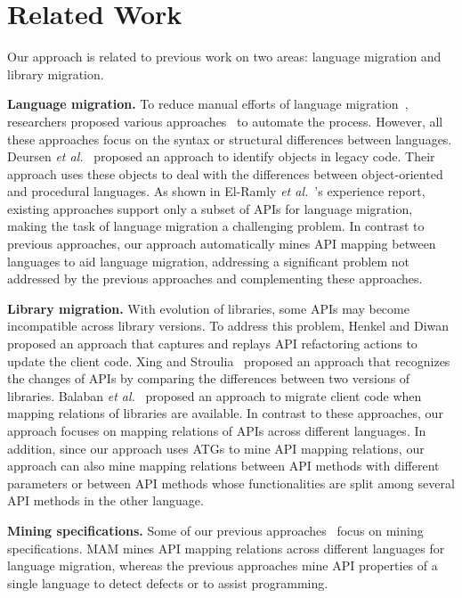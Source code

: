 \section{Related Work}
\label{sec:related}

Our approach is related to previous work on two areas:
language migration and library migration.

\textbf{Language migration.} To reduce manual efforts of language
migration~\cite{samet1981experience}, researchers proposed various
approaches~\cite{hassan2005lightweight,van1999identifying,waters1988program,mossienko2003automated,yasumatsu1995spice} to automate the process.
However, all these approaches focus on the syntax or structural differences between
languages. Deursen \emph{et al.}~\cite{van1999identifying} proposed an approach to identify
objects in legacy code. Their approach uses these objects to deal with the
differences between object-oriented and procedural languages. As
shown in El-Ramly \emph{et al.}~\cite{el2006experiment}'s experience
report, existing approaches support only a subset of APIs for language migration,
making the task of language migration a challenging problem.
In contrast to previous approaches, our approach automatically mines API mapping between
languages to aid language migration, addressing a significant
problem not addressed by the previous approaches and complementing
these approaches.

\textbf{Library migration.} With evolution of libraries, some APIs
may become incompatible across library versions. To address this
problem, Henkel and Diwan~\cite{henkel2005catchup} proposed an approach that captures
and replays API refactoring actions to update the client code.
Xing and Stroulia~\cite{xing2007api} proposed an approach that
recognizes the changes of APIs by comparing the differences between two
versions of libraries. Balaban \emph{et al.}~\cite{balaban2005refactoring} proposed
an approach to migrate client code when mapping relations of libraries are
available. In contrast to these approaches, our approach focuses on
mapping relations of APIs across different languages. In addition, since
our approach uses ATGs to mine API mapping relations, our approach can also
mine mapping relations between API methods with different parameters or between
API methods whose functionalities are split among several API methods in the other language.

\textbf{Mining specifications.} Some of our previous approaches~\cite{zhong09:inferring,zhong09:mapo,thummalapenta09:mining,thummalapenta09:mseqgen,acharya09:mining} focus on mining specifications. MAM mines API mapping relations across different languages for language migration, whereas the previous approaches mine API properties of a single language to detect defects or to assist programming.
